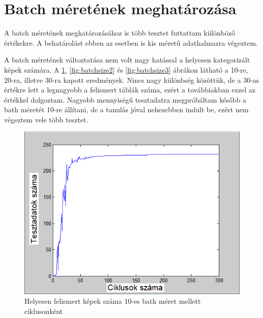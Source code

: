 \section{Batch méretének meghatározása}

A batch méretének meghatározásához is több tesztet futtattam különböző értékekre. A behatárolást ebben az esetben is kis méretű adathalmazra végeztem.

A batch méretének változtatása nem volt nagy hatással a helyesen kategorizált képek számára. A  \ref{fig:batchsize1}, \ref{fig:batchsize2} és \ref{fig:batchsize3} ábrákon látható a 10-re, 20-ra, illetve 30-ra kapott eredmények. Nincs nagy különbség közöttük, de a 30-as értékre lett a legnagyobb a felismert táblák száma, ezért a továbbiakban ezzel az értékkel dolgoztam. Nagyobb mennyiségű tesztadatra megpróbáltam később a bath méretét 10-re állítani, de a tanulás jóval nehezebben indult be, ezért nem végeztem vele több tesztet. 

\begin{figure}[h]
\centering

\includegraphics[scale=0.4]{images/Teszt7}
\caption{ Helyesen felismert képek száma 10-es bath méret mellett ciklusonként}

\label{fig:batchsize1}
\end{figure}

